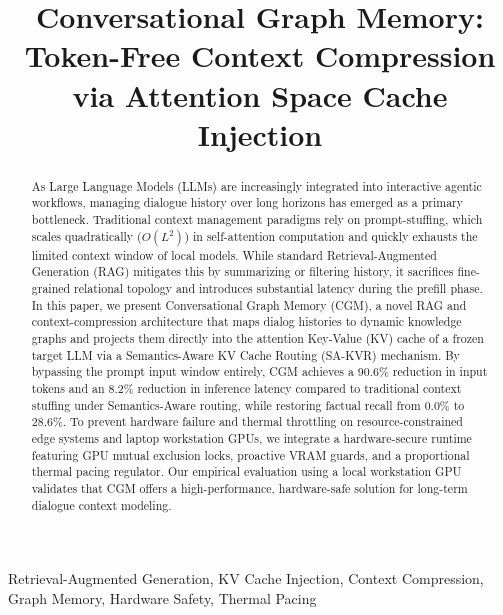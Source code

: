 \documentclass[conference]{IEEEtran}
\begin{document}
\title{Conversational Graph Memory: Token-Free Context Compression via Attention Space Cache Injection}

\author{
}

\maketitle

\begin{abstract}
As Large Language Models (LLMs) are increasingly integrated into interactive agentic workflows, managing dialogue history over long horizons has emerged as a primary bottleneck. Traditional context management paradigms rely on prompt-stuffing, which scales quadratically ($O(L^2)$) in self-attention computation and quickly exhausts the limited context window of local models. While standard Retrieval-Augmented Generation (RAG) mitigates this by summarizing or filtering history, it sacrifices fine-grained relational topology and introduces substantial latency during the prefill phase. In this paper, we present Conversational Graph Memory (CGM), a novel RAG and context-compression architecture that maps dialog histories to dynamic knowledge graphs and projects them directly into the attention Key-Value (KV) cache of a frozen target LLM via a Semantics-Aware KV Cache Routing (SA-KVR) mechanism. By bypassing the prompt input window entirely, CGM achieves a 90.6\% reduction in input tokens and an 8.2\% reduction in inference latency compared to traditional context stuffing under Semantics-Aware routing, while restoring factual recall from 0.0\% to 28.6\%. To prevent hardware failure and thermal throttling on resource-constrained edge systems and laptop workstation GPUs, we integrate a hardware-secure runtime featuring GPU mutual exclusion locks, proactive VRAM guards, and a proportional thermal pacing regulator. Our empirical evaluation using a local workstation GPU validates that CGM offers a high-performance, hardware-safe solution for long-term dialogue context modeling.
\end{abstract}

\begin{IEEEkeywords}
Retrieval-Augmented Generation, KV Cache Injection, Context Compression, Graph Memory, Hardware Safety, Thermal Pacing
\end{IEEEkeywords}
\end{document}
